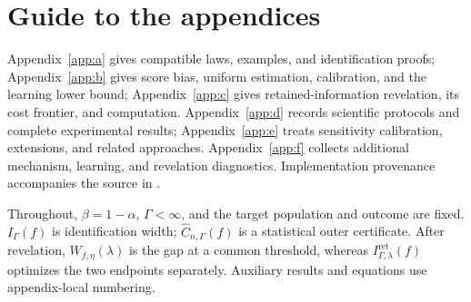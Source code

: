 \section*{Guide to the appendices}
\label{app:guide}
Appendix~\ref{app:a} gives compatible laws, examples, and identification proofs;
Appendix~\ref{app:b} gives score bias, uniform estimation, calibration, and the
learning lower bound; Appendix~\ref{app:c} gives retained-information revelation,
its cost frontier, and computation. Appendix~\ref{app:d} records scientific
protocols and complete experimental results; Appendix~\ref{app:e} treats
sensitivity calibration, extensions, and related approaches. Appendix~\ref{app:f}
collects additional mechanism, learning, and revelation diagnostics. Implementation
provenance accompanies the source in .

Throughout, $\beta=1-\alpha$, $\Gamma<\infty$, and the target population and outcome
are fixed. $I_\Gamma(f)$ is identification width; $\widehat C_{n,\Gamma}(f)$ is a
statistical outer certificate. After revelation, $W_{f,\eta}(\lambda)$ is the gap
at a common threshold, whereas $I^{\mathrm{ret}}_{\Gamma,\lambda}(f)$ optimizes the
two endpoints separately. Auxiliary results and equations use appendix-local numbering.
